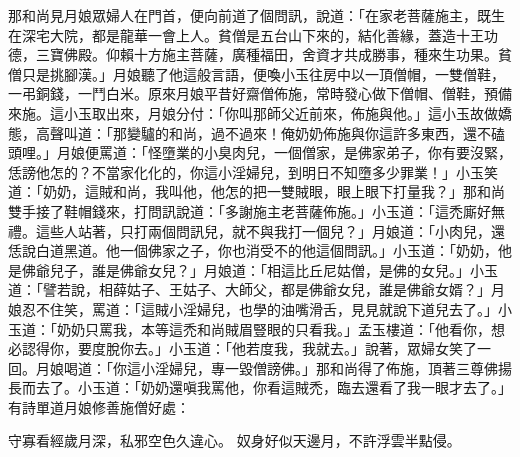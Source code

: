 那和尚見月娘眾婦人在門首，便向前道了個問訊，說道：「在家老菩薩施主，既生在深宅大院，都是龍華一會上人。貧僧是五台山下來的，結化善緣，蓋造十王功德，三寶佛殿。仰賴十方施主菩薩，廣種福田，舍資才共成勝事，種來生功果。貧僧只是挑腳漢。」月娘聽了他這般言語，便喚小玉往房中以一頂僧帽，一雙僧鞋，一弔銅錢，一鬥白米。原來月娘平昔好齋僧佈施，常時發心做下僧帽、僧鞋，預備來施。這小玉取出來，月娘分付：「你叫那師父近前來，佈施與他。」這小玉故做嬌態，高聲叫道：「那變驢的和尚，過不過來！俺奶奶佈施與你這許多東西，還不磕頭哩。」月娘便罵道：「怪墮業的小臭肉兒，一個僧家，是佛家弟子，你有要沒緊，恁謗他怎的？不當家化化的，你這小淫婦兒，到明日不知墮多少罪業！」小玉笑道：「奶奶，這賊和尚，我叫他，他怎的把一雙賊眼，眼上眼下打量我？」那和尚雙手接了鞋帽錢來，打問訊說道：「多謝施主老菩薩佈施。」小玉道：「這禿廝好無禮。這些人站著，只打兩個問訊兒，就不與我打一個兒？」月娘道：「小肉兒，還恁說白道黑道。他一個佛家之子，你也消受不的他這個問訊。」小玉道：「奶奶，他是佛爺兒子，誰是佛爺女兒？」月娘道：「相這比丘尼姑僧，是佛的女兒。」小玉道：「譬若說，相薛姑子、王姑子、大師父，都是佛爺女兒，誰是佛爺女婿？」月娘忍不住笑，罵道：「這賊小淫婦兒，也學的油嘴滑舌，見見就說下道兒去了。」小玉道：「奶奶只罵我，本等這禿和尚賊眉豎眼的只看我。」孟玉樓道：「他看你，想必認得你，要度脫你去。」小玉道：「他若度我，我就去。」說著，眾婦女笑了一回。月娘喝道：「你這小淫婦兒，專一毀僧謗佛。」那和尚得了佈施，頂著三尊佛揚長而去了。小玉道：「奶奶還嗔我罵他，你看這賊禿，臨去還看了我一眼才去了。」有詩單道月娘修善施僧好處：

守寡看經歲月深，私邪空色久違心。
奴身好似天邊月，不許浮雲半點侵。

